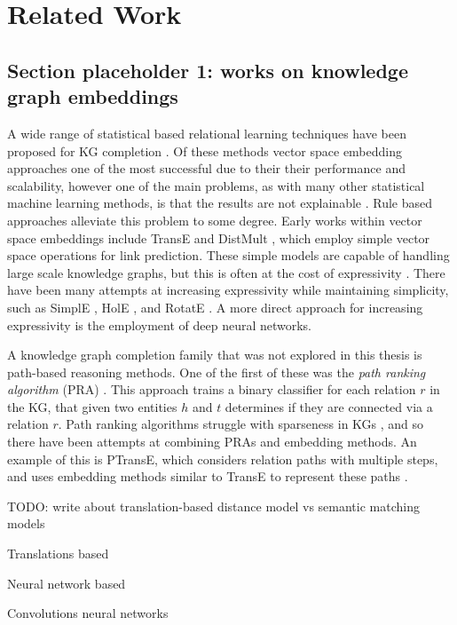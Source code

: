 \chapter{Related Work}
\section{Section placeholder 1: works on knowledge graph embeddings}

A wide range of statistical based relational learning techniques have been proposed for KG completion \cite{nickel2015review}. Of these methods vector space embedding approaches one of the most successful due to their 
their performance and scalability, however one of the main problems, as with many other statistical machine learning methods, is that the results are not explainable \cite{bonatti2019knowledge}. Rule based approaches alleviate this problem to some degree. Early works within vector space embeddings include TransE \cite{TransE} and DistMult \cite{yang2014embedding}, which employ simple vector space operations for link prediction. These simple models are capable of handling large scale knowledge graphs, but this is often at the cost of expressivity \cite{dettmers2018convolutional}. There have been many attempts at increasing expressivity while maintaining simplicity, such as SimplE \cite{SimplE}, HolE \cite{holE}, and RotatE \cite{rotatE}. A more direct approach for increasing expressivity is the employment of deep neural networks.



A knowledge graph completion family that was not explored in this thesis is path-based reasoning methods. One of the first of these was the \textit{path ranking algorithm} (PRA) \cite{lao2011random}. This approach trains a binary classifier for each relation $r$ in the KG, that given two entities $h$ and $t$ determines if they are connected via a relation $r$. Path ranking algorithms struggle with sparseness in KGs \cite{ma2019elpkg}, and so there have been attempts at combining PRAs and embedding methods. An example of this is PTransE, which considers relation paths with multiple steps, and uses embedding methods similar to TransE to represent these paths \cite{lin2015modeling}. 

TODO: write about translation-based distance model vs semantic matching models


Translations based

Neural network based

Convolutions neural networks

